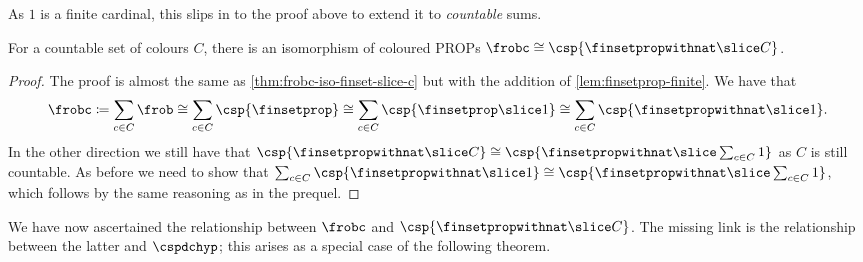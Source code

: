 As \(1\) is a finite cardinal, this slips in to the proof above to extend
it to \emph{countable} sums.

\begin{theorem}
    \label{thm:frobc-iso-hatfinset-slice-c}
    For a countable set of colours \(C\), there is an isomorphism of coloured
    PROPs \(\frobc \cong \csp{\finsetpropwithnat \slice C}\).
\end{theorem}
\begin{proof}
    The proof is almost the same as \cref{thm:frobc-iso-finset-slice-c} but with
    the addition of \cref{lem:finsetprop-finite}.
    We have that \[
        \frobc
        \coloneqq
        \sum_{c \in C}\frob
        \cong
        \sum_{c \in C}\csp{\finsetprop}
        \cong
        \sum_{c \in C}\csp{\finsetprop \slice 1}
        \cong
        \sum_{c \in C}\csp{\finsetpropwithnat \slice 1}.
    \]
    In the other direction we still have that \(
        \csp{\finsetpropwithnat \slice C}
        \cong
        \csp{\finsetpropwithnat \slice \sum_{c \in C} 1}
    \) as \(C\) is still countable.
    As before we need to show that \(
        \sum_{c \in C}\csp{\finsetpropwithnat \slice 1}
        \cong
        \csp{\finsetpropwithnat \slice \sum_{c \in C} 1}
    \), which follows by the same reasoning as in the prequel.
\end{proof}

We have now ascertained the relationship between \(\frobc\) and
\(\csp{\finsetpropwithnat \slice C}\).
The missing link is the relationship between the latter and \(\cspdchyp\);
this arises as a special case of the following theorem.

